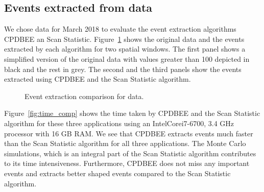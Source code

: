 \documentclass[a4paper,11pt]{article}
\begin{document}
\subsection{Events extracted from  data}\label{subsec:eventsNO2}

We chose  data for March 2018  to evaluate the event extraction algorithms CPDBEE an Scan Statistic. Figure~\ref{fig:events_set_NO2_just_2} shows the original data and the events extracted by each algorithm for two spatial windows. The first panel shows a simplified version of the original data with  values greater than 100 depicted in black and the rest in grey. The second and the third panels show the events extracted using CPDBEE and the Scan Statistic algorithm.

\begin{figure}
	\centering
	\caption{Event extraction comparison for  data.}
	\label{fig:events_set_NO2_just_2}
\end{figure}

Figure~\ref{fig:time_comp} shows the time taken by CPDBEE and the Scan Statistic algorithm for these three applications using an Intel\textregistered Core\texttrademark i7-6700, 3.4 GHz processor with 16 GB RAM. We see that CPDBEE extracts events much faster than the Scan Statistic algorithm for all three applications. The Monte Carlo simulations, which is an integral part of the Scan Statistic algorithm contributes to its time intensiveness. Furthermore,  CPDBEE does not miss any important events and extracts better shaped events compared to the Scan Statistic algorithm.
\end{document}
